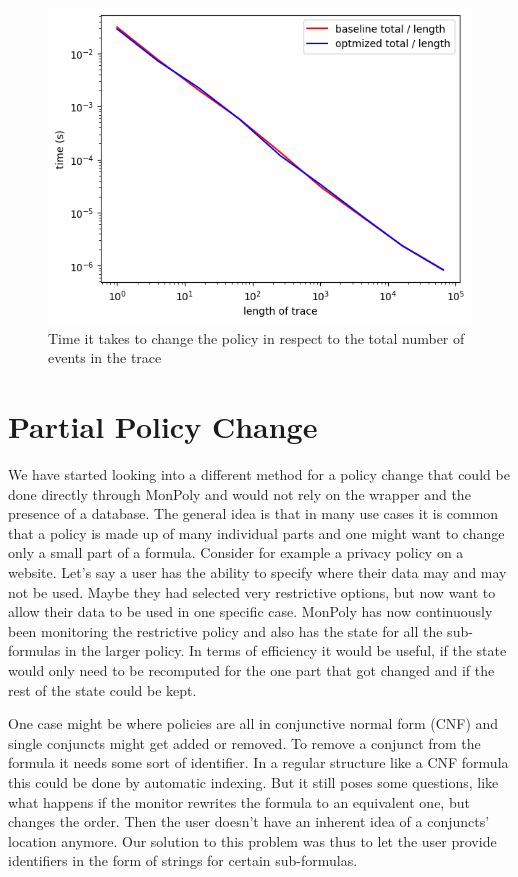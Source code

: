 \begin{figure}
    \centering
    \label{fig:policy-change-per-time-point}
    \includegraphics[width=0.8\linewidth]{diagrams/policy-change-time-per-time-point.png}
    \caption{Time it takes to change the policy in respect to the total number of events in the trace}
\end{figure}

\section{Partial Policy Change}

We have started looking into a different method for a policy change that could be done directly through MonPoly and would not rely on the wrapper and the presence of a database.
The general idea is that in many use cases it is common that a policy is made up of many individual parts and one might want to change only a small part of a formula.
Consider for example a privacy policy on a website.
Let's say a user has the ability to specify where their data may and may not be used.
Maybe they had selected very restrictive options, but now want to allow their data to be used in one specific case.
MonPoly has now continuously been monitoring the restrictive policy and also has the state for all the sub-formulas in the larger policy.
In terms of efficiency it would be useful, if the state would only need to be recomputed for the one part that got changed and if the rest of the state could be kept.

One case might be where policies are all in conjunctive normal form (CNF) and single conjuncts might get added or removed.
To remove a conjunct from the formula it needs some sort of identifier.
In a regular structure like a CNF formula this could be done by automatic indexing.
But it still poses some questions, like what happens if the monitor rewrites the formula to an equivalent one, but changes the order.
Then the user doesn't have an inherent idea of a conjuncts' location anymore.
Our solution to this problem was thus to let the user provide identifiers in the form of strings for certain sub-formulas.

